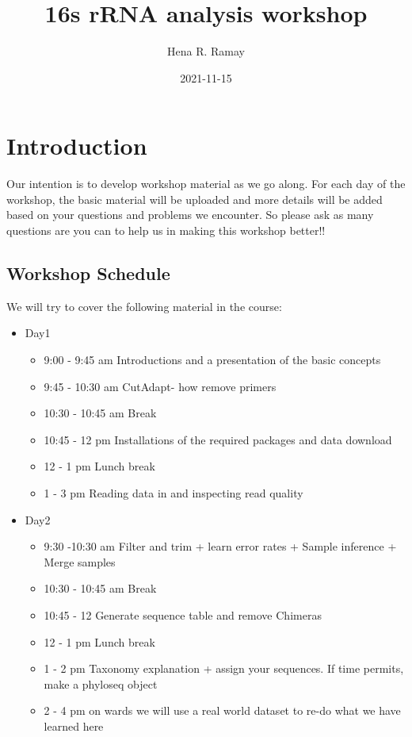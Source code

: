 \documentclass[
]{book}
\title{16s rRNA analysis workshop}
\author{Hena R. Ramay}
\date{2021-11-15}
\providecommand{\tightlist}{%
  \setlength{\itemsep}{0pt}\setlength{\parskip}{0pt}}
\begin{document}
\maketitle

{
\setcounter{tocdepth}{1}
\tableofcontents
}
\hypertarget{introduction}{%
\chapter{Introduction}\label{introduction}}

Our intention is to develop workshop material as we go along. For each day of the workshop, the basic material will be uploaded and more details will be added based on your questions and problems we encounter. So please ask as many questions are you can to help us in making this workshop better!!

\hypertarget{workshop-schedule}{%
\section{Workshop Schedule}\label{workshop-schedule}}

We will try to cover the following material in the course:

\begin{itemize}
\tightlist
\item
  Day1

  \begin{itemize}
  \tightlist
  \item
    9:00 - 9:45 am Introductions and a presentation of the basic concepts
  \item
    9:45 - 10:30 am CutAdapt- how remove primers
  \item
    10:30 - 10:45 am Break
  \item
    10:45 - 12 pm Installations of the required packages and data download
  \item
    12 - 1 pm Lunch break
  \item
    1 - 3 pm Reading data in and inspecting read quality
  \end{itemize}
\item
  Day2

  \begin{itemize}
  \tightlist
  \item
    9:30 -10:30 am Filter and trim + learn error rates + Sample inference + Merge samples
  \item
    10:30 - 10:45 am Break
  \item
    10:45 - 12 Generate sequence table and remove Chimeras
  \item
    12 - 1 pm Lunch break
  \item
    1 - 2 pm Taxonomy explanation + assign your sequences. If time permits, make a phyloseq object
  \item
    2 - 4 pm on wards we will use a real world dataset to re-do what we have learned here
  \end{itemize}
\end{itemize}
\end{document}
